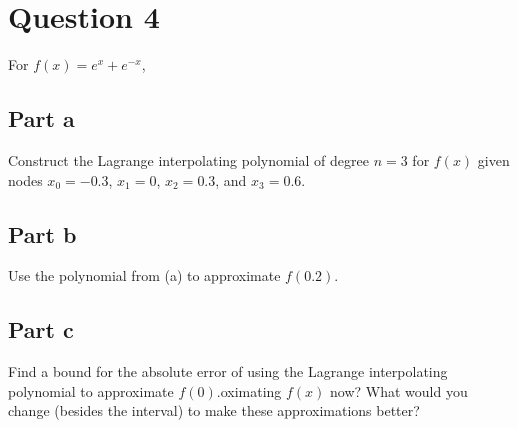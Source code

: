 \section{Question 4}

\begin{question}
    For $f(x) = e^x + e^{-x}$, 
\end{question}

\subsection{Part a}

\begin{question}
    Construct the Lagrange interpolating polynomial of degree $n=3$ for $f(x)$ given nodes $x_0 = -0.3$, $x_1 = 0$, $x_2 = 0.3$, and $x_3 = 0.6$. 
\end{question}

\begin{answer}
    
\end{answer}

\subsection{Part b}

\begin{question}
    Use the polynomial from (a) to approximate $f(0.2)$.
\end{question}

\begin{answer}
    
\end{answer}

\subsection{Part c}

\begin{question}
    Find a bound for the absolute error of using the Lagrange interpolating polynomial to approximate $f(0)$.oximating $f(x)$ now? What would you change (besides the interval) to make these approximations better?
\end{question}

\begin{answer}
    
\end{answer}